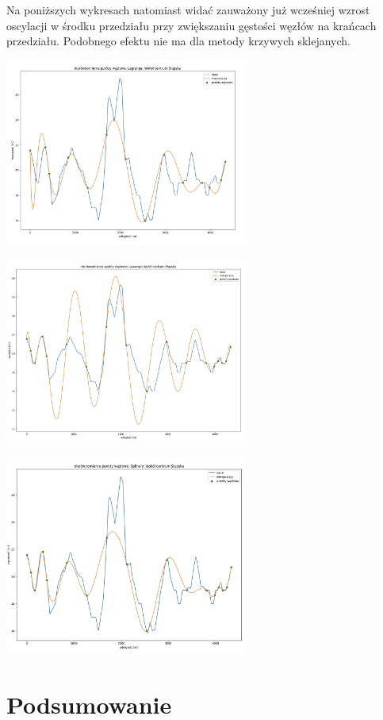 \documentclass{article}
\begin{document}
Na poniższych wykresach natomiast widać zauważony już wcześniej wzrost oscylacji w środku przedziału przy zwiększaniu gęstości węzłów na krańcach przedziału.
Podobnego efektu nie ma dla metody krzywych sklejanych.
 \begin{center}
	\includegraphics[width=8cm]{lagrange_slupsk_krance1}
\end{center}
 \begin{center}
	\includegraphics[width=8cm]{lagrange_slupsk_krance2}
\end{center}
 \begin{center}
	\includegraphics[width=8cm]{spline_slupsk_krance}
\end{center}
\section{Podsumowanie}
\end{document}
